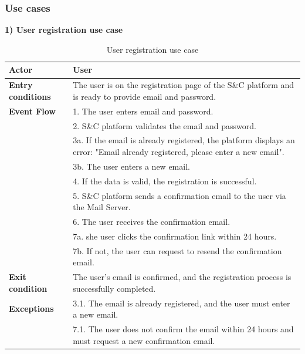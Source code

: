 \subsubsection{Use cases} 
\textbf{1) User registration use case}\\
\begin{table}[h!]
    \centering
    \begin{tabular}{lp{10cm}}
        \textbf{Actor} & User \\ \hline
        \textbf{Entry conditions} & The user is on the registration page of the S\&C platform and is ready to provide email and password. \\ \hline
        \textbf{Event Flow} & 
       1. The user enters email and password. \\
        & 2. S\&C platform validates the email and password. \\
        & 3a. If the email is already registered, the platform displays an error: "Email already registered, please enter a new email". \\
        & 3b. The user enters a new email. \\
        & 4. If the data is valid, the registration is successful. \\
        & 5. S\&C platform sends a confirmation email to the user via the Mail Server. \\
        & 6. The user receives the confirmation email. \\
        & 7a. she user clicks the confirmation link within 24 hours. \\
        & 7b. If not, the user can request to resend the confirmation email. \\
        \hline
        \textbf{Exit condition} & The user's email is confirmed, and the registration process is successfully completed. \\ \hline
        \textbf{Exceptions} & 
        3.1. The email is already registered, and the user must enter a new email. \\
        & 7.1. The user does not confirm the email within 24 hours and must request a new confirmation email. \\
    \end{tabular}
    \caption{User registration use case}
    \label{tab:user_registration}
\end{table}


